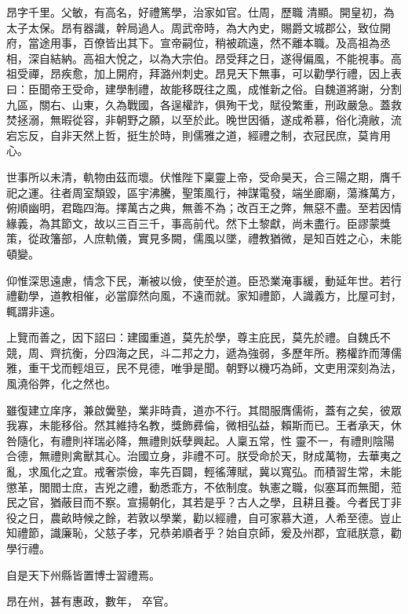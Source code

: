 \begin{pinyinscope}
 昂字千里。父敏，有高名，好禮篤學，治家如官。仕周，歷職
 清顯。開皇初，為太子太保。昂有器識，幹局過人。周武帝時，為大內史，賜爵文城郡公，致位開府，當途用事，百僚皆出其下。宣帝嗣位，稍被疏遠，然不離本職。及高祖為丞相，深自結納。高祖大悅之，以為大宗伯。昂受拜之日，遂得偏風，不能視事。高祖受禪，昂疾愈，加上開府，拜潞州刺史。昂見天下無事，可以勸學行禮，因上表曰：臣聞帝王受命，建學制禮，故能移既往之風，成惟新之俗。自魏道將謝，分割九區，關右、山東，久為戰國，各逞權詐，俱殉干戈，賦役繁重，刑政嚴急。蓋救焚拯溺，無暇從容，非朝野之願，以至於此。晚世因循，遂成希慕，俗化澆敝，流
 宕忘反，自非天然上哲，挺生於時，則儒雅之道，經禮之制，衣冠民庶，莫肯用心。



 世事所以未清，軌物由茲而壞。伏惟陛下稟靈上帝，受命昊天，合三陽之期，膺千祀之運。往者周室頹毀，區宇沸騰，聖策風行，神謀電發，端坐廊廟，蕩滌萬方，俯順幽明，君臨四海。擇萬古之典，無善不為；改百王之弊，無惡不盡。至若因情緣義，為其節文，故以三百三千，事高前代。然下土黎獻，尚未盡行。臣謬蒙獎策，從政籓部，人庶軌儀，實見多闕，儒風以墜，禮教猶微，是知百姓之心，未能頓變。



 仰惟深思遠慮，情念下民，漸被以儉，使至於道。臣恐業淹事緩，動延年世。若行
 禮勸學，道教相催，必當靡然向風，不遠而就。家知禮節，人識義方，比屋可封，輒謂非遠。



 上覽而善之，因下詔曰：建國重道，莫先於學，尊主庇民，莫先於禮。自魏氏不競，周、齊抗衡，分四海之民，斗二邦之力，遞為強弱，多歷年所。務權詐而薄儒雅，重干戈而輕俎豆，民不見德，唯爭是聞。朝野以機巧為師，文吏用深刻為法，風澆俗弊，化之然也。



 雖復建立庠序，兼啟黌塾，業非時貴，道亦不行。其間服膺儒術，蓋有之矣，彼眾我寡，未能移俗。然其維持名教，獎飾彞倫，微相弘益，賴斯而已。王者承天，休咎隨化，有禮則祥瑞必降，無禮則妖孽興起。人稟五常，性
 靈不一，有禮則陰陽合德，無禮則禽獸其心。治國立身，非禮不可。朕受命於天，財成萬物，去華夷之亂，求風化之宜。戒奢崇儉，率先百闢，輕徭薄賦，冀以寬弘。而積習生常，未能懲革，閭閻士庶，吉兇之禮，動悉乖方，不依制度。執憲之職，似塞耳而無聞，蒞民之官，猶蔽目而不察。宣揚朝化，其若是乎？古人之學，且耕且養。今者民丁非役之日，農畝時候之餘，若敦以學業，勸以經禮，自可家慕大道，人希至德。豈止知禮節，識廉恥，父慈子孝，兄恭弟順者乎？始自京師，爰及州郡，宜祗朕意，勸學行禮。



 自是天下州縣皆置博士習禮焉。



 昂在州，甚有惠政，數年，
 卒官。




\end{pinyinscope}
